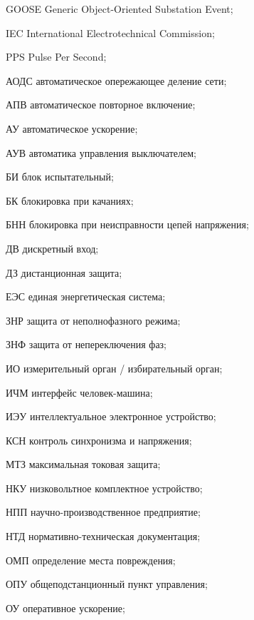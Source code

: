 \begin{list}{}%
{%
  \setlength{\labelwidth}{\abbrwidth}%
  \setlength{\labelsep}{0pt}%
  \setlength{\leftmargin}{\dimexpr\labelwidth+\labelsep\relax}%
  \setlength{\itemindent}{0pt}%
  \setlength{\parsep}{0pt}%
  \setlength{\itemsep}{0pt}
  \renewcommand{\makelabel}[1]{#1 --\hspace{\abbrgap}}%
}
\item[GOOSE] Generic Object-Oriented Substation Event;
\item[IEC]  International Electrotechnical Commission;
\item[PPS] Pulse Per Second;
\item[АОДС] автоматическое опережающее деление сети;
\item[АПВ] автоматическое повторное включение;
\item[АУ] автоматическое ускорение;
\item[АУВ] автоматика управления выключателем;
\item[БИ] блок испытательный;
\item[БК] блокировка при качаниях;
\item[БНН] блокировка при неисправности цепей напряжения;
\item[ДВ] дискретный вход;
\item[ДЗ] дистанционная защита;
\item[ЕЭС] единая энергетическая система;
\item[ЗНР] защита от неполнофазного режима;
\item[ЗНФ] защита от непереключения фаз;
\item[ИО] измерительный орган / избирательный орган;
\item[ИЧМ] интерфейс человек-машина;
\item[ИЭУ] интеллектуальное электронное устройство;
\item[КСН] контроль синхронизма и напряжения;
\item[МТЗ] максимальная токовая защита;
\item[НКУ] низковольтное комплектное устройство;
\item[НПП] научно-производственное предприятие;
\item[НТД] нормативно-техническая документация;
\item[ОМП] определение места повреждения;
\item[ОПУ] общеподстанционный пункт управления;
\item[ОУ] оперативное ускорение;

\end{list}
